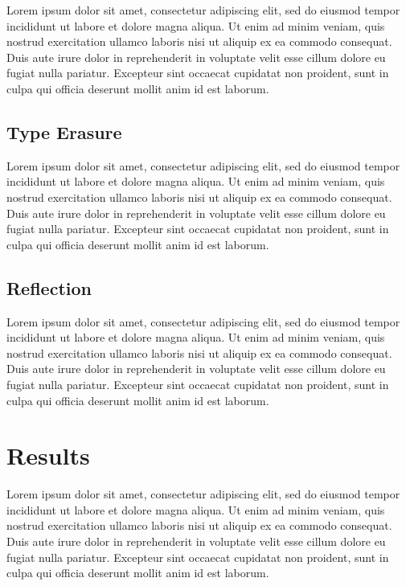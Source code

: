 \documentclass[letterpaper,twocolumn,10pt]{article}
\begin{document}
Lorem ipsum dolor sit amet, consectetur adipiscing elit, sed do eiusmod tempor incididunt ut labore et dolore magna aliqua. Ut enim ad minim veniam, quis nostrud exercitation ullamco laboris nisi ut aliquip ex ea commodo consequat. Duis aute irure dolor in reprehenderit in voluptate velit esse cillum dolore eu fugiat nulla pariatur. Excepteur sint occaecat cupidatat non proident, sunt in culpa qui officia deserunt mollit anim id est laborum.

\subsection{Type Erasure} \label{type_erasure}

Lorem ipsum dolor sit amet, consectetur adipiscing elit, sed do eiusmod tempor incididunt ut labore et dolore magna aliqua. Ut enim ad minim veniam, quis nostrud exercitation ullamco laboris nisi ut aliquip ex ea commodo consequat. Duis aute irure dolor in reprehenderit in voluptate velit esse cillum dolore eu fugiat nulla pariatur. Excepteur sint occaecat cupidatat non proident, sunt in culpa qui officia deserunt mollit anim id est laborum.

\subsection{Reflection} \label{reflection}

Lorem ipsum dolor sit amet, consectetur adipiscing elit, sed do eiusmod tempor incididunt ut labore et dolore magna aliqua. Ut enim ad minim veniam, quis nostrud exercitation ullamco laboris nisi ut aliquip ex ea commodo consequat. Duis aute irure dolor in reprehenderit in voluptate velit esse cillum dolore eu fugiat nulla pariatur. Excepteur sint occaecat cupidatat non proident, sunt in culpa qui officia deserunt mollit anim id est laborum.

\section{Results} \label{results}
Lorem ipsum dolor sit amet, consectetur adipiscing elit, sed do eiusmod tempor incididunt ut labore et dolore magna aliqua. Ut enim ad minim veniam, quis nostrud exercitation ullamco laboris nisi ut aliquip ex ea commodo consequat. Duis aute irure dolor in reprehenderit in voluptate velit esse cillum dolore eu fugiat nulla pariatur. Excepteur sint occaecat cupidatat non proident, sunt in culpa qui officia deserunt mollit anim id est laborum.
\end{document}
